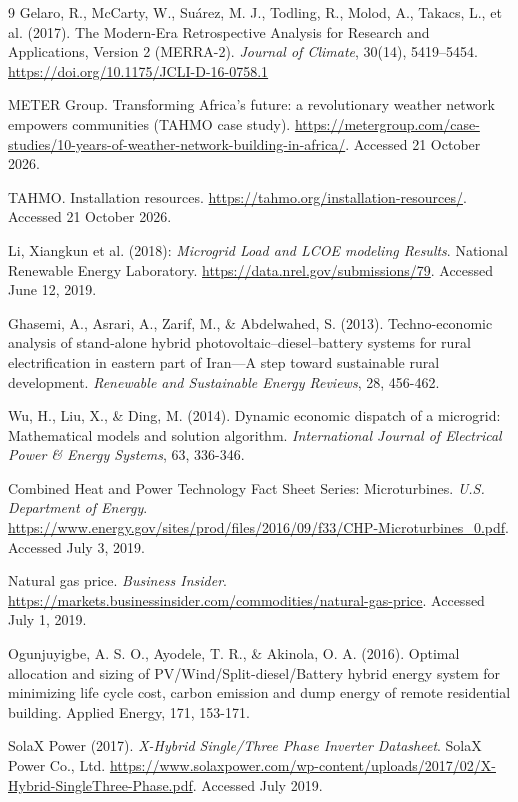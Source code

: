 \documentclass[final,3p,times]{elsarticle}
\begin{document}
\begin{thebibliography}{9}
Gelaro, R., McCarty, W., Su\'{a}rez, M. J., Todling, R., Molod, A., Takacs, L., et al. (2017). The Modern-Era Retrospective Analysis for Research and Applications, Version 2 (MERRA-2). \textit{Journal of Climate}, 30(14), 5419--5454. \url{https://doi.org/10.1175/JCLI-D-16-0758.1}

METER Group. Transforming Africa's future: a revolutionary weather network empowers communities (TAHMO case study). \url{https://metergroup.com/case-studies/10-years-of-weather-network-building-in-africa/}. Accessed 21 October 2026.

TAHMO. Installation resources. \url{https://tahmo.org/installation-resources/}. Accessed 21 October 2026.

Li, Xiangkun et al. (2018): \textit{Microgrid Load and LCOE modeling Results}. National Renewable Energy Laboratory. \url{https://data.nrel.gov/submissions/79}. Accessed June 12, 2019.

Ghasemi, A., Asrari, A., Zarif, M., \& Abdelwahed, S. (2013). Techno-economic analysis of stand-alone hybrid photovoltaic–diesel–battery systems for rural electrification in eastern part of Iran—A step toward sustainable rural development. \textit{Renewable and Sustainable Energy Reviews}, 28, 456-462.

Wu, H., Liu, X., \& Ding, M. (2014). Dynamic economic dispatch of a microgrid: Mathematical models and solution algorithm. \textit{International Journal of Electrical Power \& Energy Systems}, 63, 336-346.

Combined Heat and Power Technology Fact Sheet Series: Microturbines. \textit{U.S. Department of Energy}. \url{https://www.energy.gov/sites/prod/files/2016/09/f33/CHP-Microturbines_0.pdf}. Accessed July 3, 2019.

Natural gas price. \textit{Business Insider}. \url{https://markets.businessinsider.com/commodities/natural-gas-price}. Accessed July 1, 2019.

Ogunjuyigbe, A. S. O., Ayodele, T. R., \& Akinola, O. A. (2016). Optimal allocation and sizing of PV/Wind/Split-diesel/Battery hybrid energy system for minimizing life cycle cost, carbon emission and dump energy of remote residential building. Applied Energy, 171, 153-171.

SolaX Power (2017). \textit{X-Hybrid Single/Three Phase Inverter Datasheet}. SolaX Power Co., Ltd. \url{https://www.solaxpower.com/wp-content/uploads/2017/02/X-Hybrid-SingleThree-Phase.pdf}. Accessed July 2019.


\end{thebibliography}
\end{document}
